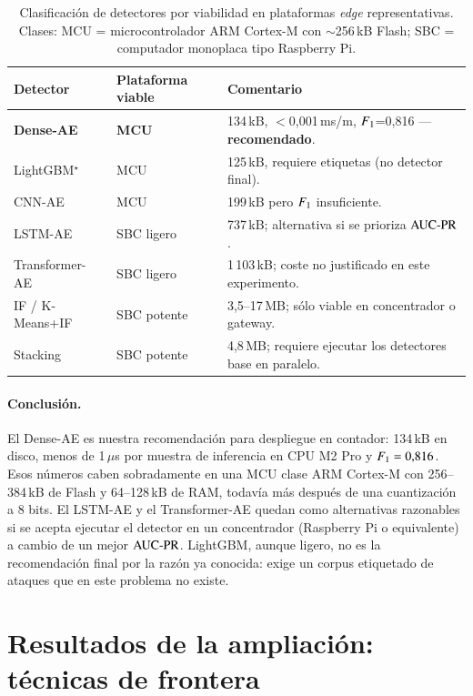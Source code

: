 \begin{table}[H]
\centering
\caption{Clasificación de detectores por viabilidad en plataformas \textit{edge} representativas. Clases: MCU = microcontrolador ARM Cortex-M con $\sim$256\,kB Flash; SBC = computador monoplaca tipo Raspberry Pi.}
\label{tab:edge-clases}
\small
\begin{tabularx}{\textwidth}{X l X}
\toprule
Detector & Plataforma viable & Comentario \\
\midrule
\textbf{Dense-AE}      & \textbf{MCU} & 134\,kB, $<$0{,}001\,ms/m, $F_{1}$=0{,}816 — \textbf{recomendado}. \\
LightGBM$^\star$       & MCU         & 125\,kB, requiere etiquetas (no detector final). \\
CNN-AE                 & MCU         & 199\,kB pero $F_{1}$ insuficiente. \\
LSTM-AE                & SBC ligero  & 737\,kB; alternativa si se prioriza $\text{AUC-PR}$. \\
Transformer-AE         & SBC ligero  & 1\,103\,kB; coste no justificado en este experimento. \\
IF / K-Means+IF        & SBC potente & 3{,}5--17\,MB; sólo viable en concentrador o gateway. \\
Stacking               & SBC potente & 4{,}8\,MB; requiere ejecutar los detectores base en paralelo. \\
\bottomrule
\end{tabularx}
\end{table}

\paragraph{Conclusión.} El Dense-AE es nuestra recomendación para despliegue en contador: 134\,kB en disco, menos de 1\,$\mu$s por muestra de inferencia en CPU M2 Pro y $F_{1}=0{,}816$. Esos números caben sobradamente en una MCU clase ARM Cortex-M con 256--384\,kB de Flash y 64--128\,kB de RAM, todavía más después de una cuantización a 8 bits. El LSTM-AE y el Transformer-AE quedan como alternativas razonables si se acepta ejecutar el detector en un concentrador (Raspberry Pi o equivalente) a cambio de un mejor $\text{AUC-PR}$. LightGBM, aunque ligero, no es la recomendación final por la razón ya conocida: exige un corpus etiquetado de ataques que en este problema no existe.

\section{Resultados de la ampliación: técnicas de frontera}
\label{sec:resultados-ampliacion}

